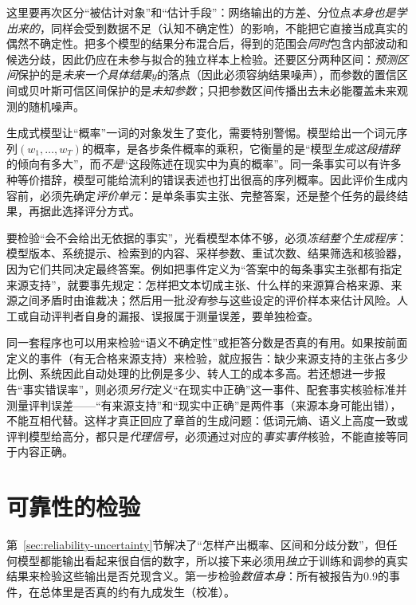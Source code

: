 这里要再次区分“被估计对象”和“估计手段”：网络输出的方差、分位点\emph{本身也是学出来的}，同样会受到数据不足（认知不确定性）的影响，不能把它直接当成真实的偶然不确定性。把多个模型的结果分布混合后，得到的范围会\emph{同时}包含内部波动和候选分歧，因此仍应在未参与拟合的独立样本上检验。还要区分两种区间：\emph{预测区间}保护的是\emph{未来一个具体结果}$y$的落点（因此必须容纳结果噪声），而参数的置信区间或贝叶斯可信区间保护的是\emph{未知参数}；只把参数区间传播出去未必能覆盖未来观测的随机噪声。

生成式模型让“概率”一词的对象发生了变化，需要特别警惕。模型给出一个词元序列$(w_1,\ldots,w_T)$的概率，是各步条件概率的乘积，它衡量的是“模型\emph{生成这段措辞}的倾向有多大”，而\emph{不是}“这段陈述在现实中为真的概率”。同一条事实可以有许多种等价措辞，模型可能给流利的错误表述也打出很高的序列概率。因此评价生成内容前，必须先确定\emph{评价单元}：是单条事实主张、完整答案，还是整个任务的最终结果，再据此选择评分方式。

要检验“会不会给出无依据的事实”，光看模型本体不够，必须\emph{冻结整个生成程序}：模型版本、系统提示、检索到的内容、采样参数、重试次数、结果筛选和核验器，因为它们共同决定最终答案。例如把事件定义为“答案中的每条事实主张都有指定来源支持”，就要事先规定：怎样把文本切成主张、什么样的来源算合格来源、来源之间矛盾时由谁裁决；然后用一批\emph{没有}参与这些设定的评价样本来估计风险。人工或自动评判者自身的漏报、误报属于测量误差，要单独检查。

同一套程序也可以用来检验“语义不确定性”或拒答分数是否真的有用。如果按前面定义的事件（有无合格来源支持）来检验，就应报告：缺少来源支持的主张占多少比例、系统因此自动处理的比例是多少、转人工的成本多高。若还想进一步报告“事实错误率”，则必须\emph{另行}定义“在现实中正确”这一事件、配套事实核验标准并测量评判误差——“有来源支持”和“现实中正确”是两件事（来源本身可能出错），不能互相代替。这样才真正回应了章首的生成问题：低词元熵、语义上高度一致或评判模型给高分，都只是\emph{代理信号}，必须通过对应的\emph{事实事件}核验，不能直接等同于内容正确。

\section{可靠性的检验}
\label{sec:reliability-evaluation}

第~\ref{sec:reliability-uncertainty}节解决了“怎样产出概率、区间和分歧分数”，但任何模型都能输出看起来很自信的数字，所以接下来必须用\emph{独立}于训练和调参的真实结果来检验这些输出是否兑现含义。第一步检验\emph{数值本身}：所有被报告为0.9的事件，在总体里是否真的约有九成发生（校准）。

